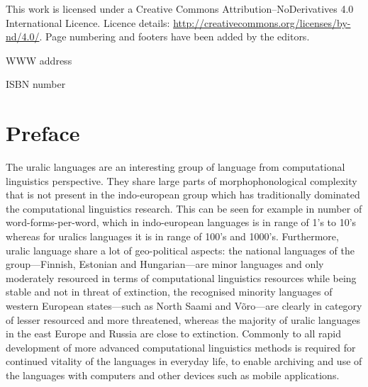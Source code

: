 \documentclass[b5paper]{book}
\begin{document}
\frontmatter

\cleardoublepage
\thispagestyle{empty}
{\centering{}}

This work is licensed under a Creative Commons Attribution–NoDerivatives
4.0 International Licence.  Licence details:
\url{http://creativecommons.org/licenses/by-nd/4.0/}. Page numbering and
footers have been added by the editors.

WWW address

ISBN number

\clearpage

\pagestyle{fancy}

\chapter*{Preface}

The uralic languages are an interesting group of language from computational
linguistics perspective. They share large parts of morphophonological
complexity that is not present in the indo-european group which has
traditionally dominated the computational linguistics research. This can be
seen for example in number of word-forms-per-word, which in indo-european
languages is in range of 1's to 10's whereas for uralics languages it is
in range of 100's and 1000's. Furthermore, uralic language share a lot
of geo-political aspects: the national languages of the group---Finnish,
Estonian and Hungarian---are minor languages and only moderately resourced
in terms of computational linguistics resources while being stable and
not in threat of extinction, the recognised minority languages of western
European states---such as North Saami and Võro---are clearly in category
of lesser resourced and more threatened, whereas the majority of uralic
languages in the east Europe and Russia are close to extinction. Commonly
to all rapid development of more advanced computational linguistics methods
is required for continued vitality of the languages in everyday life, to
enable archiving and use of the languages with computers and other devices
such as mobile applications.
\end{document}
